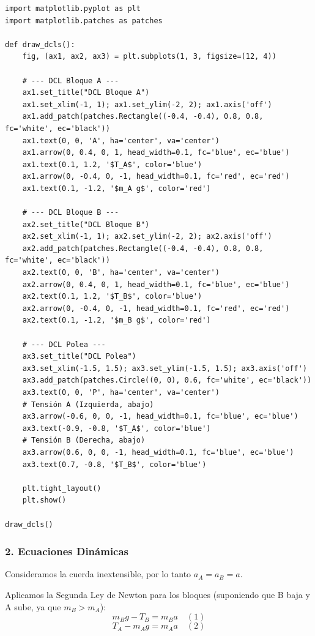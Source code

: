 \documentclass[12pt, a4paper]{article}
\begin{document}
\begin{lstlisting}
import matplotlib.pyplot as plt
import matplotlib.patches as patches

def draw_dcls():
    fig, (ax1, ax2, ax3) = plt.subplots(1, 3, figsize=(12, 4))
    
    # --- DCL Bloque A ---
    ax1.set_title("DCL Bloque A")
    ax1.set_xlim(-1, 1); ax1.set_ylim(-2, 2); ax1.axis('off')
    ax1.add_patch(patches.Rectangle((-0.4, -0.4), 0.8, 0.8, fc='white', ec='black'))
    ax1.text(0, 0, 'A', ha='center', va='center')
    ax1.arrow(0, 0.4, 0, 1, head_width=0.1, fc='blue', ec='blue')
    ax1.text(0.1, 1.2, '$T_A$', color='blue')
    ax1.arrow(0, -0.4, 0, -1, head_width=0.1, fc='red', ec='red')
    ax1.text(0.1, -1.2, '$m_A g$', color='red')
    
    # --- DCL Bloque B ---
    ax2.set_title("DCL Bloque B")
    ax2.set_xlim(-1, 1); ax2.set_ylim(-2, 2); ax2.axis('off')
    ax2.add_patch(patches.Rectangle((-0.4, -0.4), 0.8, 0.8, fc='white', ec='black'))
    ax2.text(0, 0, 'B', ha='center', va='center')
    ax2.arrow(0, 0.4, 0, 1, head_width=0.1, fc='blue', ec='blue')
    ax2.text(0.1, 1.2, '$T_B$', color='blue')
    ax2.arrow(0, -0.4, 0, -1, head_width=0.1, fc='red', ec='red')
    ax2.text(0.1, -1.2, '$m_B g$', color='red')
    
    # --- DCL Polea ---
    ax3.set_title("DCL Polea")
    ax3.set_xlim(-1.5, 1.5); ax3.set_ylim(-1.5, 1.5); ax3.axis('off')
    ax3.add_patch(patches.Circle((0, 0), 0.6, fc='white', ec='black'))
    ax3.text(0, 0, 'P', ha='center', va='center')
    # Tensión A (Izquierda, abajo)
    ax3.arrow(-0.6, 0, 0, -1, head_width=0.1, fc='blue', ec='blue')
    ax3.text(-0.9, -0.8, '$T_A$', color='blue')
    # Tensión B (Derecha, abajo)
    ax3.arrow(0.6, 0, 0, -1, head_width=0.1, fc='blue', ec='blue')
    ax3.text(0.7, -0.8, '$T_B$', color='blue')
    
    plt.tight_layout()
    plt.show()

draw_dcls()
\end{lstlisting}

\subsubsection*{2. Ecuaciones Dinámicas}
Consideramos la cuerda inextensible, por lo tanto $a_A = a_B = a$.

Aplicamos la Segunda Ley de Newton para los bloques (suponiendo que B baja y A sube, ya que $m_B > m_A$):
$$ m_B g - T_B = m_B a \quad (1) $$
$$ T_A - m_A g = m_A a \quad (2) $$
\end{document}
